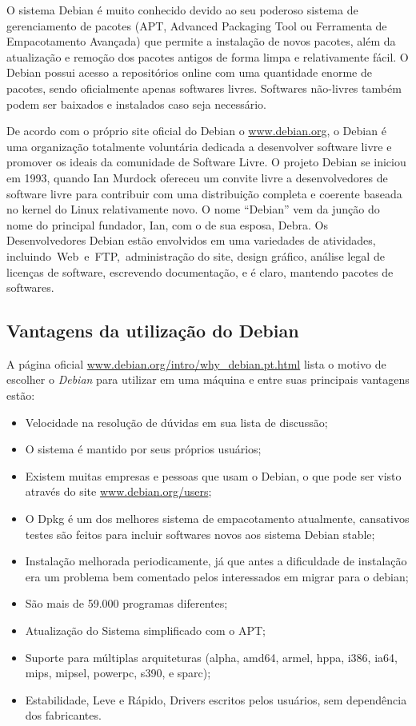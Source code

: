 O sistema Debian é muito conhecido devido ao seu poderoso sistema de gerenciamento de pacotes (APT, Advanced Packaging Tool ou Ferramenta de Empacotamento Avançada) que permite a instalação de novos pacotes, além da atualização e remoção dos pacotes antigos de forma limpa e relativamente fácil. O Debian possui acesso a repositórios online com uma quantidade enorme de pacotes, sendo oficialmente apenas softwares livres. Softwares não-livres também podem ser baixados e instalados caso seja necessário.

De acordo com o próprio site oficial do Debian o \url{www.debian.org}, o Debian é uma organização totalmente voluntária dedicada a desenvolver software livre e promover os ideais da comunidade de Software Livre. O projeto Debian se iniciou em 1993, quando Ian Murdock ofereceu um convite livre a desenvolvedores de software livre para contribuir com uma distribuição completa e coerente baseada no kernel do Linux relativamente novo. O nome “Debian” vem da junção do nome do principal fundador, Ian, com o de sua esposa, Debra. Os Desenvolvedores Debian estão envolvidos em uma variedades de atividades, incluindo Web e FTP, administração do site, design gráfico, análise legal de licenças de software, escrevendo documentação, e é claro, mantendo pacotes de softwares.

\subsection{Vantagens da utilização do Debian}
A página oficial \url{www.debian.org/intro/why\_debian.pt.html} lista o motivo de escolher o \textit{Debian} para utilizar em uma máquina e entre suas principais vantagens estão:

\begin{itemize}
	\item Velocidade na resolução de dúvidas em sua lista de discussão;
	\item O sistema é mantido por seus próprios usuários;
	\item Existem muitas empresas e pessoas que usam o Debian, o que pode ser visto através do site \url{www.debian.org/users};
	\item O Dpkg é um dos melhores sistema de empacotamento atualmente, cansativos testes são feitos para incluir softwares novos aos sistema Debian stable;
	\item Instalação melhorada periodicamente, já que antes a dificuldade de instalação era um problema bem comentado pelos interessados em migrar para o debian;
	\item São mais de 59.000 programas diferentes;
	\item Atualização do Sistema simplificado com o APT;
	\item Suporte para múltiplas arquiteturas (alpha, amd64, armel, hppa, i386, ia64, mips, mipsel, powerpc, s390, e sparc);
	\item Estabilidade, Leve e Rápido, Drivers escritos pelos usuários, sem dependência dos fabricantes.
\end{itemize}

